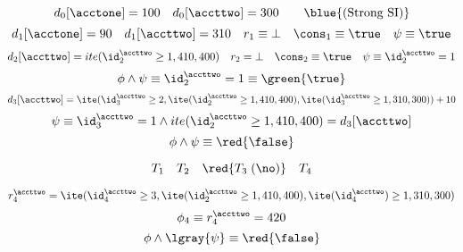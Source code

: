 
\begin{frame}{}
	\[
		d_{0}[\acctone] = 100 \quad d_{0}[\accttwo] = 300 \qquad \blue{\text{(Strong SI)}}
	\]
	\pause
	\[
		d_{1}[\acctone] = 90 \quad
		d_{1}[\accttwo] = 310 \quad
		r_{1} \equiv \bot \quad
		\cons_{1} \equiv \true \quad
		\psi \equiv \true
	\]
	\vspace{-0.30cm}
	\pause
	\[
		d_{2}[\accttwo] = ite(\id_{2}^{\accttwo} \ge 1, 410, 400) \quad
		r_{2} = \bot \quad
		\cons_{2} \equiv \true \quad
		\psi \equiv \id_{2}^{\accttwo} = 1
	\]
	\vspace{-0.40cm}
	\[
		\phi \land \psi \equiv \id_{2}^{\accttwo} = 1 \equiv \green{\true}
	\]
	\pause
	\[
		d_{3}[\accttwo] = \ite(\id_{3}^{\accttwo} \ge 2,
		  \ite(\id_{2}^{\accttwo} \ge 1, 410, 400),
			\ite(\id_{3}^{\accttwo} \ge 1, 310, 300)) + 10
	\]
	\vspace{-0.40cm}
	\[
		\psi \equiv \id_{3}^{\accttwo} = 1 \land
		  ite(\id_{2}^{\accttwo} \ge 1, 410, 400) = d_{3}[\accttwo]
	\]
	\vspace{-0.40cm}
	\[
		\phi \land \psi \equiv \red{\false}
	\]
\end{frame}

\begin{frame}{}
	\[
		T_{1}\quad T_{2}\quad \red{T_{3} \;(\text{\no})}\quad T_{4}
	\]

	\pause
	\[
		r_{4}^{\accttwo} = \ite(\id_{4}^{\accttwo} \ge 3,
		  \ite(\id_{2}^{\accttwo} \ge 1, 410, 400),
			\ite(\id_{4}^{\accttwo}) \ge 1, 310, 300)
	\]
	\pause
	\vspace{-0.40cm}
	\[
		\phi_{4} \equiv r_{4}^{\accttwo} = 420
	\]
	\pause
	\vspace{-0.40cm}
	\[
		\phi \land \lgray{\psi} \equiv \red{\false}
	\]
\end{frame}
